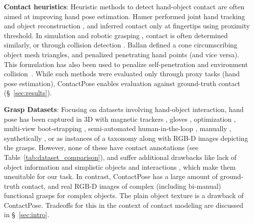 \documentclass[runningheads]{llncs}
\begin{document}
\noindent\textbf{Contact heuristics}: Heuristic methods to detect hand-object contact are often aimed at improving hand pose estimation. Hamer \etal \cite{hamer2010object} performed joint hand tracking and object reconstruction \cite{hamer2009tracking}, and inferred contact only at fingertips using proximity threshold. In simulation \cite{synthesisOfHandManipulationUsingContactSampling} and robotic grasping \cite{graspit,mahler2016dex}, contact is often determined similarly, or through collision detection \cite{teschner2005collision,larsen2000fast}. Ballan \etal \cite{ballan2012motion} defined a cone circumscribing object mesh triangles, and penalized penetrating hand points (and vice versa). This formulation has also been used to penalize self-penetration and environment collision~\cite{handsInActionDataset, SMPL-X}. While such methods were evaluated only through proxy tasks (\eg hand pose estimation), ContactPose enables evaluation against ground-truth contact (\S~\ref{sec:results}).

\noindent\textbf{Grasp Datasets}: Focusing on datasets involving hand-object interaction, hand pose has been captured in 3D with magnetic trackers \cite{FHAD_FirstPersonAction}, gloves \cite{glauser2019interactive,bernardin2005sensor}, optimization \cite{hampali2019ho}, multi-view boot-strapping \cite{simon2017hand}, semi-automated human-in-the-loop \cite{Freihand2019}, manually \cite{sridhar2016real}, synthetically \cite{learningJointReconstructionOfHandsAndManipulatedObjects}, or as instances of a taxonomy \cite{feix2015grasp, bullock2015yale,rogez2015understanding} along with RGB-D images depicting the grasps. However, none of these have contact annotations (see Table~\ref{tab:dataset_comparison}), and suffer additional drawbacks like lack of object information \cite{Freihand2019, simon2017hand} and simplistic objects \cite{sridhar2016real, FHAD_FirstPersonAction} and interactions \cite{sridhar2016real,learningJointReconstructionOfHandsAndManipulatedObjects}, which make them unsuitable for our task. In contrast, ContactPose has a large amount of ground-truth contact, and real RGB-D images of complex (including bi-manual) functional grasps for complex objects. The plain object texture is a drawback of ContactPose. Tradeoffs for this in the context of contact modeling are discussed in \S~\ref{sec:intro}.








%
\end{document}
